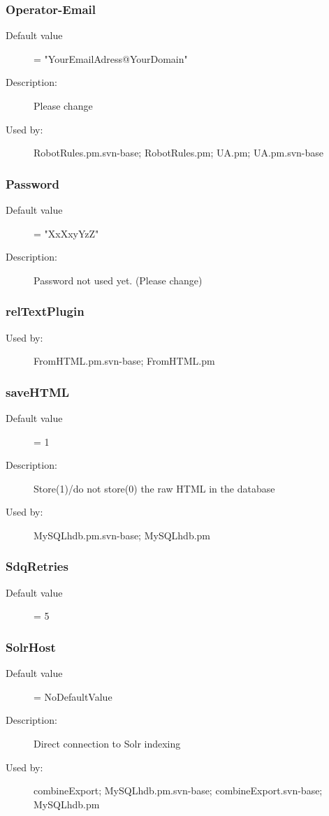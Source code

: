 \subsubsection{Operator-Email}
\label{Operator-Email}
\begin{description}
\item[Default value] = "YourEmailAdress@YourDomain"
\item[Description:] Please change
\item[Used by:] RobotRules.pm.svn-base; RobotRules.pm; UA.pm; UA.pm.svn-base
\end{description}
\subsubsection{Password}
\label{Password}
\begin{description}
\item[Default value] = "XxXxyYzZ"
\item[Description:] Password not used yet. (Please change)
\end{description}
\subsubsection{relTextPlugin}
\label{relTextPlugin}
\begin{description}
\item[Used by:] FromHTML.pm.svn-base; FromHTML.pm
\end{description}
\subsubsection{saveHTML}
\label{saveHTML}
\begin{description}
\item[Default value] = 1
\item[Description:] Store(1)/do not store(0) the raw HTML in the database
\item[Used by:] MySQLhdb.pm.svn-base; MySQLhdb.pm
\end{description}
\subsubsection{SdqRetries}
\label{SdqRetries}
\begin{description}
\item[Default value] = 5
\end{description}
\subsubsection{SolrHost}
\label{SolrHost}
\begin{description}
\item[Default value] = NoDefaultValue
\item[Description:] Direct connection to Solr indexing
\item[Used by:] combineExport; MySQLhdb.pm.svn-base; combineExport.svn-base; MySQLhdb.pm
\end{description}
